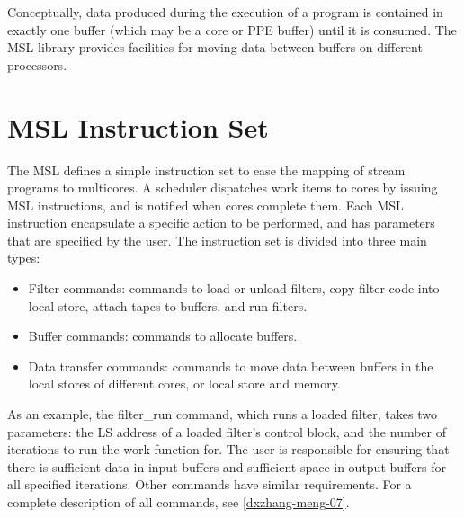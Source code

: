 


Conceptually, data produced during the execution of a program is
contained in exactly one buffer (which may be a core or PPE buffer)
until it is consumed. The MSL library provides facilities for moving
data between buffers on different processors.
 
\section{MSL Instruction Set}

The MSL defines a simple instruction set to ease the mapping of stream
programs to multicores. A scheduler dispatches work items to cores by
issuing MSL instructions, and is notified when cores complete
them. Each MSL instruction encapsulate a specific action to be
performed, and has parameters that are specified by the user. The
instruction set is divided into three main types:
\begin{itemize}
\item Filter commands: commands to load or unload filters, copy filter code into local store, attach tapes to buffers, and run filters.
\item Buffer commands: commands to allocate buffers.
\item Data transfer commands: commands to move data between buffers in the local stores of different cores, or local store and memory.
\end{itemize}

As an example, the \textsf{filter\_run} command, which runs a loaded
filter, takes two parameters: the LS address of a loaded filter's
control block, and the number of iterations to run the work function
for. The user is responsible for ensuring that there is sufficient
data in input buffers and sufficient space in output buffers for all
specified iterations. Other commands have similar requirements. For a
complete description of all commands, see \ref{dxzhang-meng-07}.

